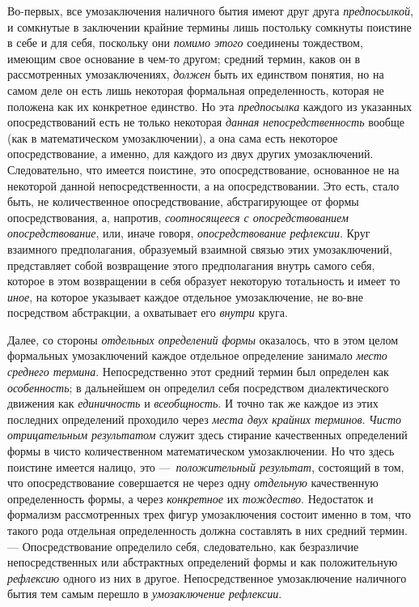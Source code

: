 \documentclass[twoside]{article}
\begin{document}
{{{{{Во-первых, все умозаключения наличного бытия имеют друг друга
{\em предпосылкой}, и
сомкнутые в заключении крайние термины лишь постольку сомкнуты поистине в
себе и для себя, поскольку они
{\em помимо этого}
соединены тождеством, имеющим свое основание в чем-то другом;
средний термин, каков он в рассмотренных умозаключениях,
{\em должен} быть их
единством понятия, но на самом деле он есть лишь некоторая формальная
определенность, которая не положена как их конкретное единство. Но эта
{\em предпосылка} каждого
из указанных опосредствований есть не только некоторая
{\em данная
}{\em непосредственность}
вообще (как в математическом умозаключении), а она сама есть
некоторое опосредствование, а именно, для каждого из двух других
умозаключений. Следовательно, что имеется поистине, это опосредствование,
основанное не на некоторой данной непосредственности, а на
опосредствовании. Это есть, стало быть, не количественное опосредствование,
абстрагирующее от формы опосредствования, а, напротив,
{\em соотносящееся с опосредствованием
опосредствование}, или, иначе говоря,
{\em опосредствование рефлексии}.
Круг взаимного предполагания, образуемый взаимной связью этих
умозаключений, представляет собой возвращение этого предполагания внутрь
самого себя, которое в этом возвращении в себя образует некоторую
тотальность и имеет то {\em иное},
на которое указывает каждое отдельное умозаключение, не
во-вне посредством абстракции, а охватывает его
{\em внутри} круга.

Далее, со стороны
{\em отдельных определений формы}
оказалось, что в этом целом формальных умозаключений каждое
отдельное определение занимало
{\em место среднего термина}.
Непосредственно этот средний термин был определен как
{\em особенность}; в
дальнейшем он определил себя посредством диалектического движения как
{\em единичность} и
{\em всеобщность}. И
точно так же каждое из этих последних определений проходило через
{\em места двух крайних терминов}.
{\em Чисто отрицательным результатом}
служит здесь стирание качественных определений формы в чисто
количественном математическом умозаключении. Но что здесь поистине имеется
налицо, это —~{\em положительный
результат}, состоящий в том, что опосредствование
совершается не через одну
{\em отдельную}
качественную определенность формы, а через
{\em конкретное} их
{\em тождество}.
Недостаток и формализм рассмотренных трех фигур умозаключения
состоит именно в том, что такого рода отдельная определенность должна
составлять в них средний термин. — Опосредствование
определило себя, следовательно, как безразличие непосредственных или
абстрактных определений формы и как положительную
{\em рефлексию} одного из
них в другое. \label{bkm:bm110b}Непосредственное
умозаключение наличного бытия тем самым перешло в
{\em умозаключение рефлексии}.

}}}}}
\end{document}
